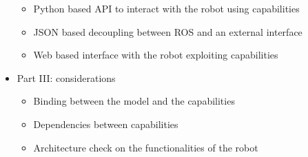 \begin{itemize}
\begin{itemize}
		\item Python based API to interact with the robot using capabilities
		\item JSON based decoupling between ROS and an external interface
		\item Web based interface with the robot exploiting capabilities
	\end{itemize}
	\item Part III: considerations
	\begin{itemize}
		\item Binding between the model and the capabilities
		\item Dependencies between capabilities
		\item Architecture check on the functionalities of the robot
	\end{itemize}
\end{itemize}



\endgroup

\vfill
